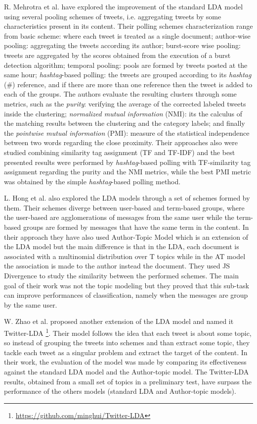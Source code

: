 R. Mehrotra et al. \cite{kn:Mehrotra2013} have explored the improvement of the standard LDA model using several pooling schemes of tweets, i.e. aggregating tweets by some characteristics present in its content. Their polling schemes characterization range from basic scheme: where each tweet is treated as a single document; author-wise pooling: aggregating the tweets according its author; burst-score wise pooling: tweets are aggregated by the scores obtained from the execution of a burst detection algorithm; temporal pooling: pools are formed by tweets posted at the same hour; \textit{hashtag}-based polling: the tweets are grouped according to its \textit{hashtag} (\#) reference, and if there are more than one reference then the tweet is added to each of the groups. The authors evaluate the resulting clusters through some metrics, such as the \textit{purity}: verifying the average of the corrected labeled tweets inside the clustering; \textit{normalized mutual information} (NMI): its the calculus of the matching results between the clustering and the category labels; and finally the \textit{pointwise mutual information} (PMI): measure of the statistical independence between two words regarding the close proximity. Their approaches also were studied combining similarity tag assignment (TF and TF-IDF) and the best presented results were performed by \textit{hashtag}-based polling with TF-similarity tag assignment regarding the purity and the NMI metrics, while the best PMI metric was obtained by the simple \textit{hashtag}-based polling method.

L. Hong et al. \cite{kn:Hong2010} also explored the LDA models through a set of schemes formed by them. Their schemes diverge between user-based and term-based groups, where the user-based are agglomerations of messages from the same user while the term-based groups are formed by messages that have the same term in the content. In their approach they have also used Author-Topic Model which is an extension of the LDA model but the main difference is that in the LDA, each document is associated with a multinomial distribution over T topics while in the AT model the association is made to the author instead the document. They used JS Divergence to study the similarity between the performed schemes. The main goal of their work was not the topic modeling but they proved that this sub-task can improve performances of classification, namely when the messages are group by the same user.

W. Zhao et al. \cite{kn:Zhao2011} proposed another extension of the LDA model and named it Twitter-LDA \footnote{\url{https://github.com/minghui/Twitter-LDA}}. Their model follows the idea that each tweet is about some topic, so instead of grouping the tweets into schemes and than extract some topic, they tackle each tweet as a singular problem and extract the target of the content. In their work, the evaluation of the model was made by comparing its effectiveness against the standard LDA model and the Author-topic model. The Twitter-LDA results, obtained from a small set of topics in a preliminary test, have surpass the performance of the others models (standard LDA and Author-topic models).

